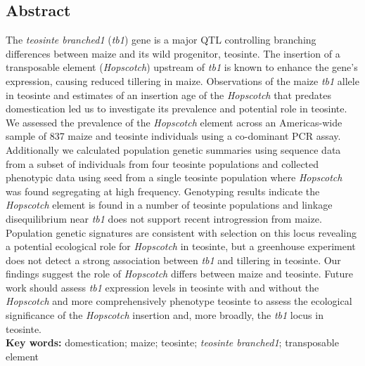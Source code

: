 \documentclass[]{article}
\begin{document}
\subsection*{Abstract}

The \emph{teosinte branched1} (\emph{tb1}) gene is a major QTL controlling branching differences between maize and its wild progenitor, teosinte. The insertion of a transposable element (\emph{Hopscotch}) upstream of \emph{tb1} is known to enhance the gene's expression, causing reduced tillering in maize. Observations of the maize \emph{tb1} allele in teosinte and estimates of an insertion age of the \emph{Hopscotch} that predates domestication led us to investigate its prevalence and potential role in teosinte. We assessed the prevalence of the \emph{Hopscotch} element across an Americas-wide sample of 837 maize and teosinte individuals using a co-dominant PCR assay. Additionally we calculated population genetic summaries using sequence data from a subset of individuals from four teosinte populations and collected phenotypic data using seed from a single teosinte population where \emph{Hopscotch} was found segregating at high frequency. Genotyping results indicate the \emph{Hopscotch} element is found in a number of teosinte populations and linkage disequilibrium near \emph{tb1} does not support recent introgression from maize. Population genetic signatures are consistent with selection on this locus revealing a potential ecological role for \emph{Hopscotch} in teosinte, but a greenhouse experiment does not detect a strong association between \emph{tb1} and tillering in teosinte.
Our findings suggest the role of \emph{Hopscotch} differs between maize and teosinte. Future work should assess \emph{tb1} expression levels in teosinte with and without the \emph{Hopscotch} and more comprehensively phenotype teosinte to assess the ecological significance of the \emph{Hopscotch} insertion and, more broadly, the \emph{tb1} locus in teosinte.\\


\textbf{Key words:} domestication; maize; teosinte; \emph{teosinte branched1}; transposable element

\clearpage
\end{document}

